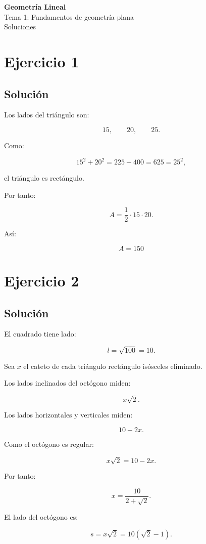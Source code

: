 \documentclass[11pt,a4paper]{article}
\begin{document}
\begin{center}
{\LARGE\bfseries Geometría Lineal}\\[0.4em]
{\Large Tema 1: Fundamentos de geometría plana}\\[0.4em]
{\large Soluciones}
\end{center}

\section{Ejercicio 1}
\subsection{Solución}

Los lados del triángulo son:

\[
15,\qquad 20,\qquad 25.
\]

Como:

\[
15^2+20^2
=
225+400
=
625
=
25^2,
\]

el triángulo es rectángulo.

Por tanto:

\[
A
=
\frac12\cdot15\cdot20.
\]

Así:

\[
\boxed{A=150}
\]

\section{Ejercicio 2}
\subsection{Solución}

El cuadrado tiene lado:

\[
l=\sqrt{100}=10.
\]

Sea \(x\) el cateto de cada triángulo rectángulo isósceles eliminado.

Los lados inclinados del octógono miden:

\[
x\sqrt2.
\]

Los lados horizontales y verticales miden:

\[
10-2x.
\]

Como el octógono es regular:

\[
x\sqrt2=10-2x.
\]

Por tanto:

\[
x
=
\frac{10}{2+\sqrt2}.
\]

El lado del octógono es:

\[
s=x\sqrt2
=
10(\sqrt2-1).
\]
\end{document}
